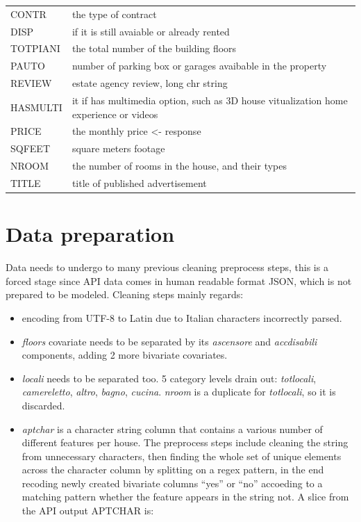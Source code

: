 \documentclass[
  12pt,
  a4paper,
  oneside]{book}
\providecommand{\tightlist}{%
  \setlength{\itemsep}{0pt}\setlength{\parskip}{0pt}}
\theoremstyle{definition}
\theoremstyle{definition}
\theoremstyle{definition}
\theoremstyle{remark}
\begin{document}
\begin{longtable}{ll}
CONTR & the type of contract\\
DISP & if it is still avaiable or already rented\\
\addlinespace
TOTPIANI & the total number of the building floors\\
PAUTO & number of parking box or garages avaibable in the property\\
REVIEW & estate agency review, long chr string\\
HASMULTI & it if has multimedia option, such as 3D house vitualization home experience or videos\\
PRICE & the monthly price <- response\\
\addlinespace
SQFEET & square meters footage\\
NROOM & the number of rooms in the house, and their types\\
TITLE & title of published advertisement\\
\bottomrule
\end{longtable}

\hypertarget{prep}{%
\section{Data preparation}\label{prep}}

Data needs to undergo to many previous cleaning preprocess steps, this is a forced stage since API data comes in human readable format JSON, which is not prepared to be modeled. Cleaning steps mainly regards:

\begin{itemize}
\tightlist
\item
  encoding from UTF-8 to Latin due to Italian characters incorrectly parsed.
\item
  \emph{floors} covariate needs to be separated by its \emph{ascensore} and \emph{accdisabili} components, adding 2 more bivariate covariates.
\item
  \emph{locali} needs to be separated too. 5 category levels drain out: \emph{totlocali}, \emph{camereletto}, \emph{altro}, \emph{bagno}, \emph{cucina}. \emph{nroom} is a duplicate for \emph{totlocali}, so it is discarded.
\item
  \emph{aptchar} is a character string column that contains a various number of different features per house. The preprocess steps include cleaning the string from unnecessary characters, then finding the whole set of unique elements across the character column by splitting on a regex pattern, in the end recoding newly created bivariate columns ``yes'' or ``no'' accoeding to a matching pattern whether the feature appears in the string not. A slice from the API output APTCHAR is:
\end{itemize}
\end{document}
